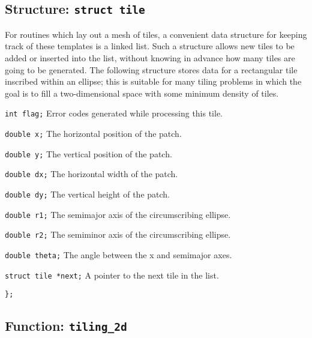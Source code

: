 \clearpage
\subsection{Structure: {\tt struct tile}}
\label{ss:tile}

For routines which lay out a mesh of tiles, a convenient data
structure for keeping track of these templates is a linked list.  Such
a structure allows new tiles to be added or inserted into the list,
without knowing in advance how many tiles are going to be generated.
The following structure stores data for a rectangular tile inscribed
within an ellipse; this is suitable for many tiling problems in which
the goal is to fill a two-dimensional space with some minimum density
of tiles.

\begin{description}
\item{\tt int flag;}
  Error codes generated while processing this tile.

\item{\tt double x;}
  The horizontal position of the patch.

\item{\tt double y;}
  The vertical position of the patch.

\item{\tt double dx;}
  The horizontal width of the patch.

\item{\tt double dy;}
  The vertical height of the patch.

\item{\tt double r1;}
  The semimajor axis of the circumscribing ellipse.

\item{\tt double r2;}
  The semiminor axis of the circumscribing ellipse.

\item{\tt double theta;}
  The angle between the x and semimajor axes.

\item{\tt struct tile *next;}
  A pointer to the next tile in the list.

\end{description}
{\tt\};}


\clearpage
\subsection{Function: {\tt tiling\_2d}}
\label{ss:tiling_2d}

